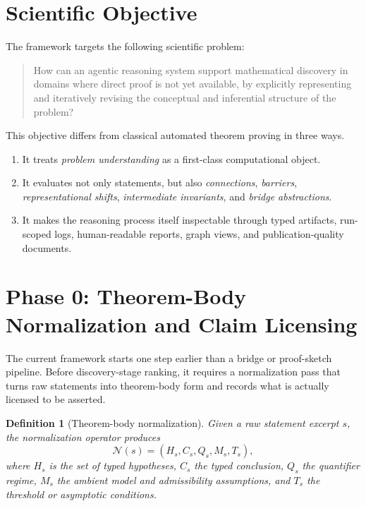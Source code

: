 \documentclass[11pt]{article}
\newtheorem{definition}{Definition}
\begin{document}
\section{Scientific Objective}

The framework targets the following scientific problem:

\begin{quote}
How can an agentic reasoning system support mathematical discovery in domains where direct proof is not yet available, by explicitly representing and iteratively revising the conceptual and inferential structure of the problem?
\end{quote}

This objective differs from classical automated theorem proving in three ways.

\begin{enumerate}[leftmargin=*,itemsep=0.3em]
\item It treats \emph{problem understanding} as a first-class computational object.
\item It evaluates not only statements, but also \emph{connections}, \emph{barriers}, \emph{representational shifts}, \emph{intermediate invariants}, and \emph{bridge abstractions}.
\item It makes the reasoning process itself inspectable through typed artifacts, run-scoped logs, human-readable reports, graph views, and publication-quality documents.
\end{enumerate}

\section{Phase 0: Theorem-Body Normalization and Claim Licensing}

The current framework starts one step earlier than a bridge or proof-sketch pipeline. Before discovery-stage ranking, it requires a normalization pass that turns raw statements into theorem-body form and records what is actually licensed to be asserted.

\begin{definition}[Theorem-body normalization]
Given a raw statement excerpt $s$, the normalization operator produces
\[
\mathcal{N}(s) = (H_s, C_s, Q_s, M_s, T_s),
\]
where $H_s$ is the set of typed hypotheses, $C_s$ the typed conclusion, $Q_s$ the quantifier regime, $M_s$ the ambient model and admissibility assumptions, and $T_s$ the threshold or asymptotic conditions.
\end{definition}
\end{document}
